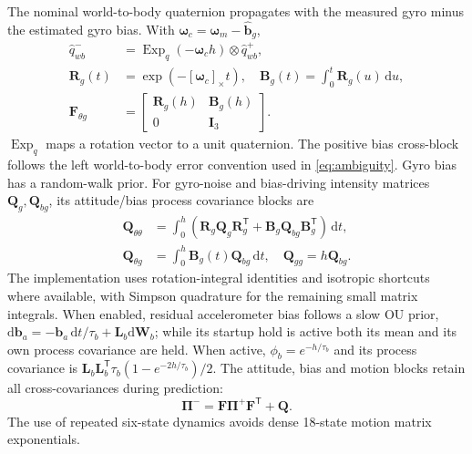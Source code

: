 \documentclass[conference]{IEEEtran}
\newcommand{\vc}[1]{\bm{#1}}
\newcommand{\mt}[1]{\bm{#1}}
\newcommand{\tr}{^{\mathsf T}}
\newcommand{\sk}[1]{[#1]_\times}
\newcommand{\dd}{\mathrm d}
\begin{document}
The nominal world-to-body quaternion propagates with the measured gyro
minus the estimated gyro bias. With $\vc\omega_c=\vc\omega_m-\hat{\vc b}_g$,
\begin{align}
 \hat q_{wb}^-&=\operatorname{Exp}_q(-\vc\omega_ch)\otimes\hat q_{wb}^+,\nonumber\\
 \mt R_g(t)&=\exp(-\sk{\vc\omega_c}t),\quad
 \mt B_g(t)=\int_0^t\mt R_g(u)\,\dd u,\nonumber\\
 \mt F_{\theta g}&=\begin{bmatrix}\mt R_g(h)&\mt B_g(h)\\0&\mt I_3\end{bmatrix}.
 \label{eq:attitudeprediction}
\end{align}
$\operatorname{Exp}_q$ maps a rotation vector to a unit quaternion.
The positive bias cross-block follows the left world-to-body error
convention used in \cref{eq:ambiguity}. Gyro bias has a random-walk prior.
For gyro-noise and bias-driving intensity matrices $\mt Q_g,\mt Q_{bg}$,
its attitude/bias process covariance blocks are
\begin{align}
 \mt Q_{\theta\theta}&=\int_0^h
 (\mt R_g\mt Q_g\mt R_g\tr+\mt B_g\mt Q_{bg}\mt B_g\tr)\,\dd t,\nonumber\\
 \mt Q_{\theta g}&=\int_0^h\mt B_g(t)\mt Q_{bg}\,\dd t,\quad
 \mt Q_{gg}=h\mt Q_{bg}.
 \label{eq:attitudenoise}
\end{align}
The implementation uses rotation-integral identities and isotropic
shortcuts where available, with Simpson quadrature for the remaining
small matrix integrals.
When enabled, residual accelerometer bias follows a slow OU prior,
$\dd\vc b_a=-\vc b_a\,\dd t/\tau_b+\mt L_b\dd\vc W_b$;
while its startup hold is active both its mean and its own process
covariance are held. When active, $\phi_b=e^{-h/\tau_b}$ and its process
covariance is $\mt L_b\mt L_b\tr\tau_b(1-e^{-2h/\tau_b})/2$.
The attitude, bias and motion blocks retain all
cross-covariances during prediction:
\begin{equation}
 \mt\Pi^- =\mt F\mt\Pi^+\mt F\tr+\mt Q.
 \label{eq:predict}
\end{equation}
The use of repeated six-state dynamics avoids dense 18-state motion
matrix exponentials.
\end{document}
